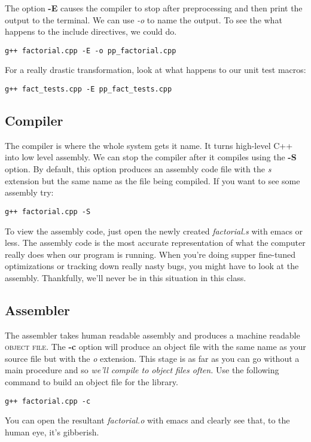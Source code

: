\documentclass[]{tufte-handout}
\begin{document}
The option \textbf{-E} causes the compiler to stop after preprocessing and then print the output to the terminal.  We can use \textit{-o} to name the output. 
To see the what happens to the include directives, we could do.
\begin{verbatim}
g++ factorial.cpp -E -o pp_factorial.cpp
\end{verbatim}

For a really drastic transformation, look at what happens to our unit test macros:
\begin{verbatim}
g++ fact_tests.cpp -E pp_fact_tests.cpp
\end{verbatim}


\subsection{Compiler}

The compiler is where the whole system gets it name.  It turns high-level C++ into low level assembly.  We can stop the compiler after it compiles using the \textbf{-S} option. By default, this option produces an assembly code file with the \textit{s} extension but the same name as the file being compiled. If you want to see some assembly try:
\begin{verbatim}
g++ factorial.cpp -S
\end{verbatim}
To view the assembly code, just open the newly created \textit{factorial.s} with emacs or less. The assembly code is the most accurate representation of what the computer really does when our program is running.  When you're doing supper fine-tuned optimizations or tracking down really nasty bugs, you might have to look at the assembly.  Thankfully, we'll never be in this situation in this class.  

\subsection{Assembler}

The assembler takes human readable assembly and produces a machine readable \textsc{object file}.   The \textbf{-c} option will produce an object file with the same name as your source file but with the \textit{o} extension.  This stage is as far as you can go without a main procedure and so \textit{we'll compile to object files often.}  Use the following command to build an object file for the library.
\begin{verbatim}
g++ factorial.cpp -c
\end{verbatim}
You can open the resultant \textit{factorial.o} with emacs and clearly see that, to the human eye, it's gibberish.  
\end{document}
